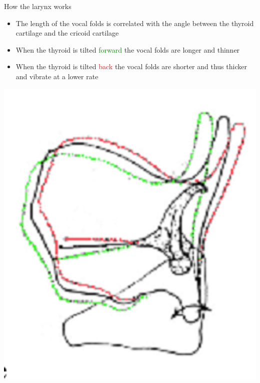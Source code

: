 \documentclass[professionalfonts]{beamer}
\begin{document}
\begin{frame}{How the larynx works}
    \begin{multicols}{2}

        \begin{itemize}
            \item The length of the vocal folds is correlated with the angle between the thyroid cartilage and the cricoid cartilage
            \item When the thyroid is tilted \textcolor{green}{forward} the vocal folds are longer and thinner
            \item When the thyroid is tilted \textcolor{red}{back} the vocal folds are shorter and thus thicker and vibrate at a lower rate
        \end{itemize}

        \columnbreak

        \includegraphics[width = \linewidth]{figs/LaryngealTilt.png}

    \end{multicols}
\end{frame}
\end{document}
